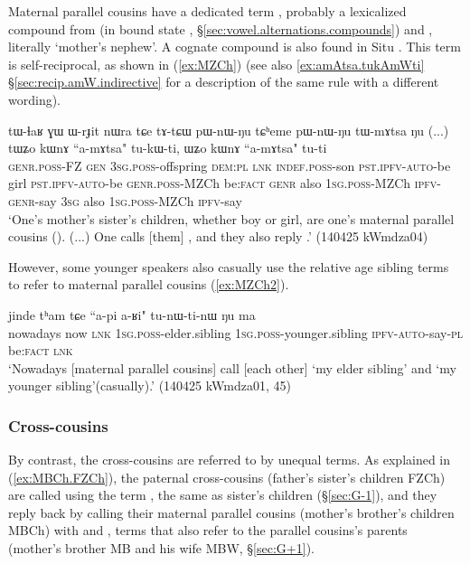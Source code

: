 Maternal parallel cousins have a dedicated term , probably a lexicalized compound from  (in bound state , §\ref{sec:vowel.alternations.compounds}) and , literally `mother's nephew'. A cognate compound is also found in Situ \citep{zhangsy20kinship}. This term is self-reciprocal, as shown in (\ref{ex:MZCh}) (see also \ref{ex:amAtsa.tukAmWti} §\ref{sec:recip.amW.indirective} for a description of the same rule with a different wording).

\begin{exe}
\ex \label{ex:MZCh}
\gll tɯ-ɬaʁ ɣɯ ɯ-rɟit nɯra tɕe tɤ-tɕɯ pɯ-nɯ-ŋu tɕʰeme pɯ-nɯ-ŋu tɯ-mɤtsa ŋu (...) tɯʑo kɯnɤ ``a-mɤtsa" tu-kɯ-ti, ɯʑo kɯnɤ ``a-mɤtsa" tu-ti \\
\textsc{genr}.\textsc{poss}-FZ \textsc{gen} \textsc{3sg}.\textsc{poss}-offspring \textsc{dem}:\textsc{pl} \textsc{lnk} \textsc{indef}.\textsc{poss}-son \textsc{pst}.\textsc{ipfv}-\textsc{auto}-be girl \textsc{pst}.\textsc{ipfv}-\textsc{auto}-be \textsc{genr}.\textsc{poss}-MZCh be:\textsc{fact} {  } \textsc{genr} also \textsc{1sg}.\textsc{poss}-MZCh \textsc{ipfv}-\textsc{genr}-say \textsc{3sg} also \textsc{1sg}.\textsc{poss}-MZCh \textsc{ipfv}-say \\
\glt `One's mother's sister's children, whether boy or girl, are one's maternal parallel cousins (). (...) One calls [them] , and they also reply .' (140425 kWmdza04)
\end{exe}

However, some younger speakers also casually use the relative age sibling terms to refer to maternal parallel cousins (\ref{ex:MZCh2}). 

\begin{exe}
\ex \label{ex:MZCh2}
\gll jinde tʰam tɕe ``a-pi a-ʁi" tu-nɯ-ti-nɯ ŋu ma  \\
nowadays now \textsc{lnk} \textsc{1sg}.\textsc{poss}-elder.sibling \textsc{1sg}.\textsc{poss}-younger.sibling \textsc{ipfv}-\textsc{auto}-say-\textsc{pl} be:\textsc{fact} \textsc{lnk} \\
\glt `Nowadays [maternal parallel cousins] call [each other]  `my elder sibling' and   `my younger sibling'(casually).' (140425 kWmdza01, 45)
\end{exe}


\subsubsection{Cross-cousins} \label{sec:ego.cross.cousins}
By contrast, the cross-cousins are referred to by unequal terms. As explained in (\ref{ex:MBCh.FZCh}), the paternal cross-cousins (father's sister's children FZCh) are called using the term , the same as sister's children (§\ref{sec:G-1}), and they reply back by calling their maternal parallel cousins (mother's brother's children MBCh) with  and , terms that also refer to the parallel cousins's parents (mother's brother MB and his wife MBW, §\ref{sec:G+1}). 


